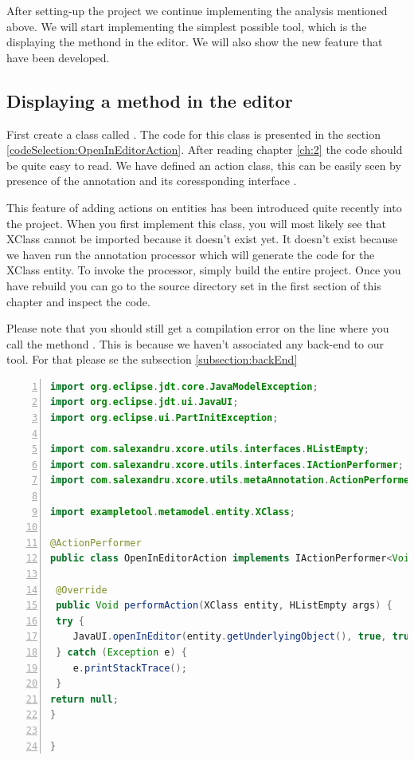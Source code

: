         After setting-up the project we continue implementing the analysis mentioned above. We will start implementing the simplest possible tool, which is the displaying the methond in the editor.
        We will also show the new feature that have been developed.

\subsection{Displaying a method in the editor}
       
        First create a class called . The code for this class is presented in the section \ref{codeSelection:OpenInEditorAction}.
After reading chapter \ref{ch:2} the code should be quite easy to read. We have defined an action class, this can be easily seen by presence of the annotation
 and its coressponding interface . 
       
        This feature of adding actions on entities has been introduced quite recently into the project. 
        When you first implement this class, you will most likely see that XClass cannot be imported because it doesn't exist yet.  It doesn't exist because we haven run the annotation processor 
which will generate the code for the XClass entity. To invoke the processor, simply build the entire project. Once you have rebuild you can go to the source directory set in the first section of
this chapter and inspect the code. 

        Please note that you should still get a compilation error on the line where you call the methond . This is because we haven't associated any back-end to our tool.
For that please se the subsection \ref{subsection:backEnd}

\small
\begin{lstlisting}[language=Java,numbers=left]
import org.eclipse.jdt.core.JavaModelException;
import org.eclipse.jdt.ui.JavaUI;
import org.eclipse.ui.PartInitException;

import com.salexandru.xcore.utils.interfaces.HListEmpty;
import com.salexandru.xcore.utils.interfaces.IActionPerformer;
import com.salexandru.xcore.utils.metaAnnotation.ActionPerformer;

import exampletool.metamodel.entity.XClass;

@ActionPerformer
public class OpenInEditorAction implements IActionPerformer<Void, XClass, HListEmpty> {

 @Override
 public Void performAction(XClass entity, HListEmpty args) {
 try {
    JavaUI.openInEditor(entity.getUnderlyingObject(), true, true);
 } catch (Exception e) {
    e.printStackTrace();
 }
return null;
}

}
\end{lstlisting}
\normalsize{}\label{codeSelection:OpenInEditorAction}

